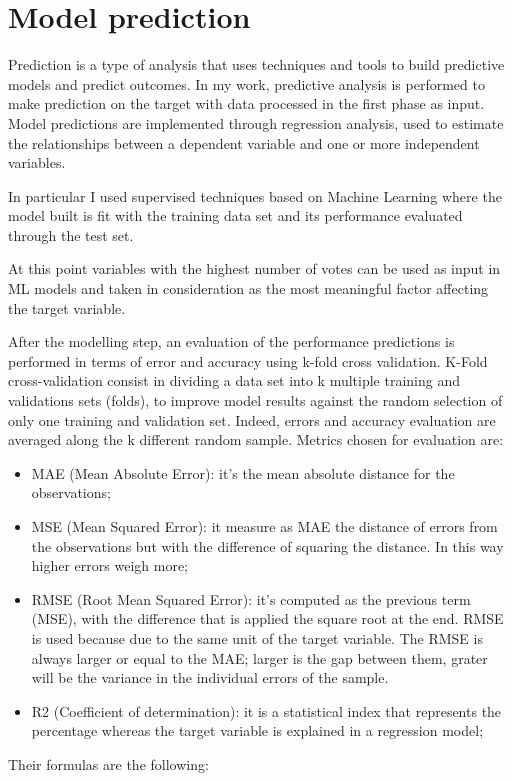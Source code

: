 \section{Model prediction}
Prediction is a type of analysis that uses techniques and tools to build predictive models and predict outcomes. 
In my work, predictive analysis is performed to make prediction on the target with data processed in the first phase as input.\newline
Model predictions are implemented through regression analysis, used to estimate the relationships between a dependent variable and one or more independent variables.\par
In particular I used supervised techniques based on Machine Learning where the model built is fit with the training data set and its performance evaluated through the test set. 
\par
At this point variables with the highest number of votes can be used as input in ML models and taken in consideration as the most meaningful factor affecting the target variable.
\par
After the modelling step, an evaluation of the performance predictions is performed in terms of error and accuracy using k-fold cross validation.\newline
K-Fold cross-validation consist in dividing a data set into k multiple training and validations sets (folds), to improve model results against the random selection of only one training and validation set. Indeed, errors and accuracy evaluation are averaged along the k different random sample.
Metrics chosen for evaluation are:
\begin{itemize}
    \item MAE (Mean Absolute Error): it's the mean absolute distance for the observations;
    \item MSE (Mean Squared Error): it measure as MAE the distance of errors from the observations but with the difference of squaring the distance. In this way higher errors weigh more;
    \item RMSE (Root Mean Squared Error): it's computed as the previous term (MSE), with the difference that is applied the square root at the end. RMSE is used because due to the same unit of the target variable.
    The RMSE is always larger or equal to the MAE; larger is the gap between them, grater will be the variance in the individual errors of the sample.
    \item R2 (Coefficient of determination): it is a statistical index that represents the percentage whereas the target variable is explained in a regression model;
\end{itemize} 
Their formulas are the following:
